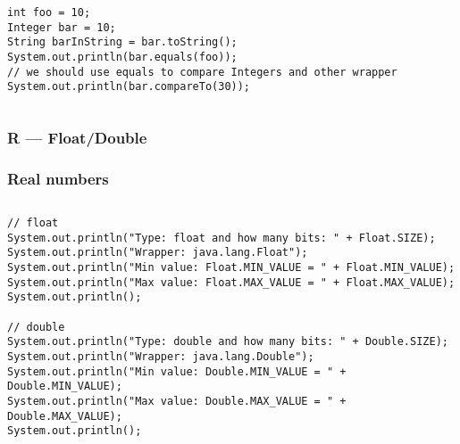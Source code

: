 \documentclass[
  11pt, %
  xcolor=dvipsnames
]{beamer}
\begin{document}
\begin{frame}[fragile]
\begin{columns}[c]
\begin{column}{0.9\textwidth}
			\begin{lstlisting}[style=Java]
int foo = 10;
Integer bar = 10;
String barInString = bar.toString();
System.out.println(bar.equals(foo));
// we should use equals to compare Integers and other wrapper
System.out.println(bar.compareTo(30));
  \end{lstlisting}

		\end{column}
	\end{columns}

\end{frame}

\subsubsection{R --- Float/Double}
\begin{frame}[fragile]
	\frametitle{Real numbers}


	\begin{columns}[c]
		\begin{column}{0.9\textwidth}

			\begin{lstlisting}[style=Java]
// float
System.out.println("Type: float and how many bits: " + Float.SIZE);
System.out.println("Wrapper: java.lang.Float");
System.out.println("Min value: Float.MIN_VALUE = " + Float.MIN_VALUE);
System.out.println("Max value: Float.MAX_VALUE = " + Float.MAX_VALUE);
System.out.println();

// double
System.out.println("Type: double and how many bits: " + Double.SIZE);
System.out.println("Wrapper: java.lang.Double");
System.out.println("Min value: Double.MIN_VALUE = " + Double.MIN_VALUE);
System.out.println("Max value: Double.MAX_VALUE = " + Double.MAX_VALUE);
System.out.println(); 
      \end{lstlisting}

		\end{column}
	\end{columns}

\end{frame}
\end{document}
